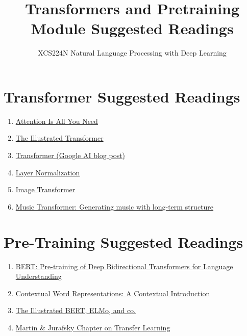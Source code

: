 \documentclass{article}
\title{Transformers and Pretraining Module Suggested Readings}
\author{XCS224N Natural Language Processing with Deep Learning}
\date{}
\begin{document}
\maketitle

\section{Transformer Suggested Readings}
\begin{enumerate}
    \item \href{https://arxiv.org/pdf/1706.03762.pdf}{Attention Is All You Need}
    \item \href{https://jalammar.github.io/illustrated-transformer/}{The Illustrated Transformer}
    \item \href{https://ai.googleblog.com/2017/08/transformer-novel-neural-network.html}{Transformer (Google AI blog post)}
    \item \href{https://arxiv.org/pdf/1607.06450.pdf}{Layer Normalization}
    \item \href{https://arxiv.org/pdf/1802.05751.pdf}{Image Transformer}
    \item \href{https://arxiv.org/pdf/1809.04281.pdf}{Music Transformer: Generating music with long-term structure}
\end{enumerate}

\section{Pre-Training Suggested Readings}
\begin{enumerate}
    \item \href{https://arxiv.org/pdf/1810.04805.pdf}{BERT: Pre-training of Deep Bidirectional Transformers for Language Understanding}
    \item \href{https://arxiv.org/pdf/1902.06006.pdf}{Contextual Word Representations: A Contextual Introduction}
    \item \href{http://jalammar.github.io/illustrated-bert/}{The Illustrated BERT, ELMo, and co.}
    \item \href{https://web.stanford.edu/~jurafsky/slp3/11.pdf}{Martin \& Jurafsky Chapter on Transfer Learning}
\end{enumerate}
\end{document}
